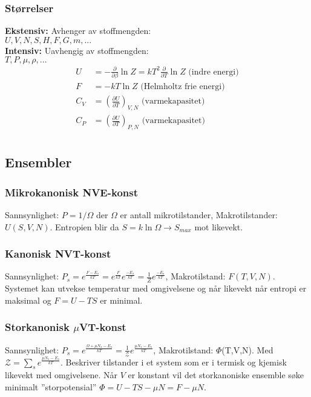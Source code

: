 \documentclass[a4paper, norsk, 10pt]{article}
\newcommand{\EQU}[1] { \begin{equation*} \begin{split}
#1  
\end{split} \end{equation*} }
\newcommand{\PAR}[2]{ \frac{\partial #1}{\partial #2}}
\begin{document}
\begin{multicols*}{2}
\subsubsection*{Størrelser}
\textbf{Ekstensiv:} Avhenger av stoffmengden: \\
$U,V,N,S,H,F,G,m,...$ \\
\textbf{Intensiv:} Uavhengig av stoffmengden: \\
$T,P,\mu,\rho,...$ \\
\EQU{
U &= -\PAR{}{\beta}\ln Z = kT^2 \PAR{}{T} \ln Z \text{ (indre energi)}\\
F &= -kT\ln Z \text{ (Helmholtz frie energi)}\\
C_V & = \left(\PAR{U}{T}\right)_{V,N} \text{ (varmekapasitet)} \\
C_P & = \left(\PAR{U}{T}\right)_{P,N} \text{ (varmekapasitet)} \\
}


\subsection*{Ensembler}
\subsubsection*{Mikrokanonisk NVE-konst}
Sannsynlighet: $P = 1/\Omega$ der $\Omega$ er antall mikrotilstander, Makrotilstander: $U(S,V,N)$. Entropien blir da $S=k\ln \Omega \rightarrow S_{max}$ mot likevekt.


\subsubsection*{Kanonisk NVT-konst }
Sannsynlighet: $P_s=e^\frac{F-E_s}{kT}=e^\frac{F}{kT}e^\frac{-E_s}{kT}=\frac{1}{Z}e^\frac{-E_s}{kT}$, Makrotilstand: $F(T,V,N)$. Systemet kan utvekse temperatur med omgivelsene og når likevekt når entropi er maksimal og $F=U-TS$ er minimal.

\subsubsection*{Storkanonisk $\mu$VT-konst}
Sannsynlighet: $P_s=e^\frac{\Omega+\mu N_s - E_s}{kT}=\frac{1}{\mathcal{Z}}e^\frac{\mu N_s-E_s}{kT}$,
Makrotilstand: $\Phi$(T,V,N). Med $\mathcal{Z}=\sum_s e^\frac{\mu N_s-E_s}{kT}$. Beskriver tilstander i et system som er i termisk og kjemisk likevekt med omgivelsene. Når $V$ er konstant vil det storkanoniske ensemble søke minimalt ''storpotensial'' $\Phi=U-TS-\mu N = F-\mu N$.


\end{multicols*}
\end{document}
